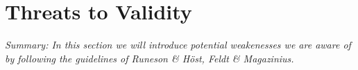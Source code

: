\iffalse  \fi
\chapter{Threats to Validity}


\textit{Summary: In this section we will introduce potential weakenesses we are aware of by following the guidelines of Runeson \& Höst, Feldt \& Magazinius.}
